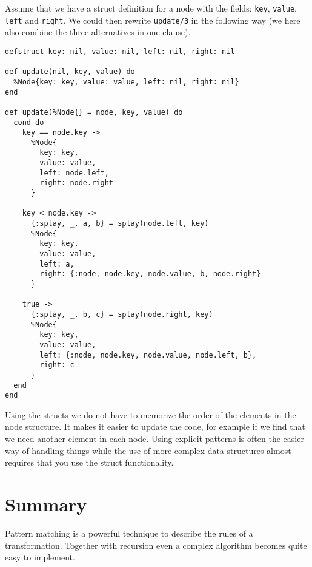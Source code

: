 \documentclass[a4paper,11pt]{article}
\begin{document}
Assume that we have a struct definition for a node with the fields:
{\tt key}, {\tt value}, {\tt left} and {\tt right}. We could then
rewrite {\tt update/3} in the following way (we here also combine the
three alternatives in one clause).

\begin{verbatim}
defstruct key: nil, value: nil, left: nil, right: nil

def update(nil, key, value) do
  %Node{key: key, value: value, left: nil, right: nil}
end

def update(%Node{} = node, key, value) do
  cond do
    key == node.key ->
      %Node{
        key: key,
        value: value,
        left: node.left,
        right: node.right
      }

    key < node.key ->
      {:splay, _, a, b} = splay(node.left, key)
      %Node{
        key: key,
        value: value,
        left: a,
        right: {:node, node.key, node.value, b, node.right}
      }

    true ->
      {:splay, _, b, c} = splay(node.right, key)
      %Node{
        key: key,
        value: value,
        left: {:node, node.key, node.value, node.left, b},
        right: c
      }
  end
end
\end{verbatim}

Using the structs we do not have to memorize the order of the
elements in the node structure. It makes it easier to update the code,
for example if we find that we need another element in each
node. Using explicit patterns is often the easier way of handling
things while the use of more complex data structures almost requires
that you use the struct functionality.



\section{Summary}

Pattern matching is a powerful technique to describe the rules of a
transformation. Together with recursion even a complex algorithm
becomes quite easy to implement. 
\end{document}
